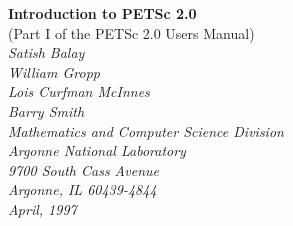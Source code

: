 %
%
%
%
\setlength{\textwidth}{6.5in}
\setlength{\oddsidemargin}{0.0in}
\setlength{\evensidemargin}{0.0in}
\setlength{\textheight}{9.2in}
\setlength{\topmargin}{-.8in}

\newcommand{\findex}[1]{\index{FUNCTION #1}}
\newcommand{\sindex}[1]{\index{#1}}
 
\def\design{\medskip \noindent Design Issue:\begin{em}}
\def\enddesign{\end{em} \medskip}


\def\shortintro{*}
\renewcommand{\cite}[1]{}
\def\thesection {$\!\!\!\!$}



\begin{center}
$\!$
\vspace{1.0cm}
\thispagestyle{empty}

{\huge \bf Introduction to PETSc 2.0}\\ 
\vspace{0.5cm}
{\LARGE (Part I of the PETSc 2.0 Users Manual)} \\
\vspace{1.5cm}
{\large \em Satish Balay\\William Gropp\\Lois Curfman McInnes\\Barry Smith\\
\medskip \medskip
Mathematics and Computer Science Division\\
Argonne National Laboratory\\
9700 South Cass Avenue\\
Argonne, IL 60439-4844\\
\medskip
April, 1997}
\end{center}

